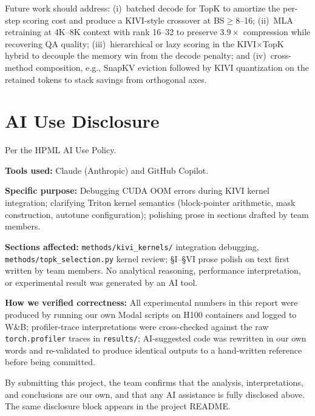 \documentclass[conference]{IEEEtran}
\begin{document}
Future work should address: (i)~batched decode for TopK to amortize
the per-step scoring cost and produce a KIVI-style crossover at
BS$\geq$8--16; (ii)~MLA retraining at 4K--8K context with rank 16--32
to preserve $3.9\times$ compression while recovering QA quality;
(iii)~hierarchical or lazy scoring in the KIVI$\times$TopK hybrid to
decouple the memory win from the decode penalty; and (iv)~cross-method
composition, e.g., SnapKV eviction followed by KIVI quantization on
the retained tokens to stack savings from orthogonal axes.

\appendix
\section*{AI Use Disclosure}

Per the HPML AI Use Policy.

\textbf{Tools used:} Claude (Anthropic) and GitHub Copilot.

\textbf{Specific purpose:} Debugging CUDA OOM errors during KIVI
kernel integration; clarifying Triton kernel semantics (block-pointer
arithmetic, mask construction, autotune configuration); polishing
prose in sections drafted by team members.

\textbf{Sections affected:} \texttt{methods/kivi\_kernels/} integration
debugging, \texttt{methods/topk\_selection.py} kernel review;
\S{}I--\S{}VI prose polish on text first written by team members.  No
analytical reasoning, performance interpretation, or experimental
result was generated by an AI tool.

\textbf{How we verified correctness:} All experimental numbers in this
report were produced by running our own Modal scripts on H100
containers and logged to W\&B; profiler-trace interpretations were
cross-checked against the raw \texttt{torch.profiler} traces in
\texttt{results/}; AI-suggested code was rewritten in our own words
and re-validated to produce identical outputs to a hand-written
reference before being committed.

By submitting this project, the team confirms that the analysis,
interpretations, and conclusions are our own, and that any AI
assistance is fully disclosed above.  The same disclosure block
appears in the project README.


\end{document}
